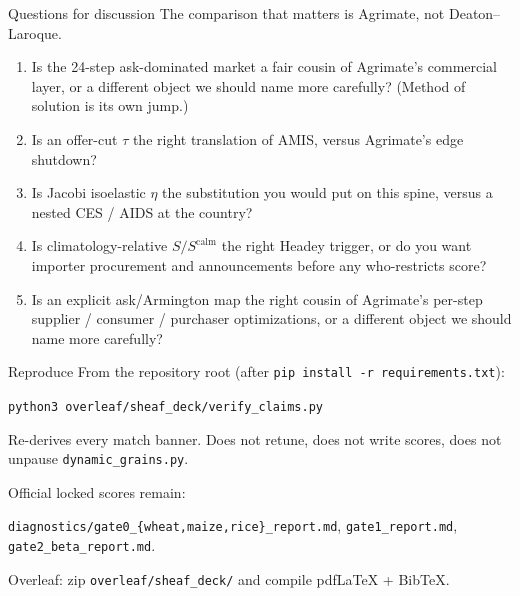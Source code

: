 \begin{frame}[label=questions]{Questions for discussion}
The comparison that matters is Agrimate, not Deaton--Laroque.

\begin{enumerate}
\item Is the 24-step ask-dominated market a fair cousin of Agrimate's
      commercial layer, or a different object we should name more
      carefully? (Method of solution is its own jump.)
\item Is an offer-cut $\tau$ the right translation of AMIS, versus
      Agrimate's edge shutdown?
\item Is Jacobi isoelastic $\eta$ the substitution you would put on this
      spine, versus a nested CES / AIDS at the country?
\item Is climatology-relative $S/S^{\mathrm{calm}}$ the right Headey
      trigger, or do you want importer procurement and announcements
      before any who-restricts score?
\item Is an explicit ask/Armington map the right cousin of Agrimate's
      per-step supplier / consumer / purchaser optimizations, or a
      different object we should name more carefully?
\end{enumerate}
\end{frame}

\begin{frame}{Reproduce}
From the repository root (after \texttt{pip install -r requirements.txt}):

\begin{center}
\texttt{python3 overleaf/sheaf\_deck/verify\_claims.py}
\end{center}

Re-derives every match banner. Does not retune, does not write
scores, does not unpause \texttt{dynamic\_grains.py}.

Official locked scores remain:

\texttt{diagnostics/gate0\_\{wheat,maize,rice\}\_report.md},
\texttt{gate1\_report.md}, \texttt{gate2\_beta\_report.md}.

Overleaf: zip \texttt{overleaf/sheaf\_deck/} and compile pdfLaTeX + BibTeX.
\end{frame}

